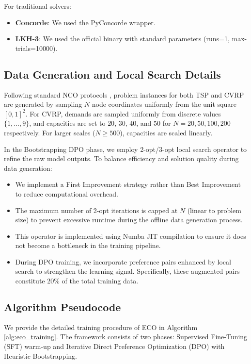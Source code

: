 \documentclass{article}
\theoremstyle{plain}
\theoremstyle{definition}
\theoremstyle{remark}
\begin{document}
For traditional solvers: 
\begin{itemize}
    \item \textbf{Concorde}: We used the PyConcorde wrapper.
    \item \textbf{LKH-3}: We used the official binary with standard parameters (runs=1, max-trials=10000).
\end{itemize}

\subsection{Data Generation and Local Search Details}
Following standard NCO protocols \cite{3}, problem instances for both TSP and CVRP are generated by sampling $N$ node coordinates uniformly from the unit square $[0, 1]^2$. For CVRP, demands are sampled uniformly from discrete values $\{1, \dots, 9\}$, and capacities are set to $20$, $30$, $40$, and $50$ for $N=20, 50, 100, 200$ respectively. For larger scales ($N \ge 500$), capacities are scaled linearly.


In the Bootstrapping DPO phase, we employ  2-opt/3-opt local search operator to refine the raw model outputs. To balance efficiency and solution quality during data generation:
\begin{itemize}
\item We implement a First Improvement strategy rather than Best Improvement to reduce computational overhead.
\item The maximum number of 2-opt iterations is capped at $N$ (linear to problem size) to prevent excessive runtime during the offline data generation process.
\item This operator is implemented using Numba JIT compilation to ensure it does not become a bottleneck in the training pipeline.
\item During DPO training, we incorporate preference pairs enhanced by local search to strengthen the learning signal. Specifically, these augmented pairs constitute 20\% of the total training data.
\end{itemize}

\subsection{Algorithm Pseudocode}
We provide the detailed training procedure of ECO in Algorithm \ref{alg:eco_training}. The framework consists of two phases: Supervised Fine-Tuning (SFT) warm-up and Iterative Direct Preference Optimization (DPO) with Heuristic Bootstrapping.
\end{document}
